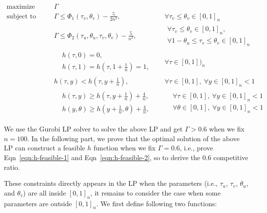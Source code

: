 \begin{align}
    \text{maximize}\qquad & \Gamma \nonumber \\
    \text{subject to}
    \qquad & \Gamma \leq \Phi_1(\tau_v,\theta_v) - \frac{5}{2n^2}, 
    &\forall \tau_v \leq \theta_v \in [0,1]_n & \label{constraint:v-arrive-first}& \\
    & \Gamma \leq \Phi_2(\tau_u,\theta_u,\tau_v,\theta_v) - \frac{5}{n^2}, 
    &\begin{aligned}
        \forall \tau_v \leq \theta_v \in [0,1]_n, \\
        \forall 1-\theta_u\le \tau_v \le \theta_v \in [0,1]_n 
    \end{aligned} &
    \label{constraint:u-arrive-first} &\\
& 
\begin{aligned}
    &h(\tau,0) = 0, \\
    &h(\tau,1) = h(\tau, 1+\frac{1}{n}) = 1,
\end{aligned}\quad 
  &\forall \tau \in [0,1])_n &&\\ 
& h(\tau,y) < h(\tau, y+\frac{1}{n}),
  & \forall \tau \in [0,1], ~\forall y\in[0,1]_n < 1 &\tag{Monotonicity} &\\
&\begin{aligned}
 & \textstyle h(\tau, y) \geq h(\tau, y+\frac{1}{n}) + \frac{4}{n}, \\
 & \textstyle h(y, \theta) \geq h(y+\frac{1}{n}, \theta) + \frac{4}{n},  
\end{aligned} 
& \begin{aligned}
    &\forall \tau \in [0,1], ~\forall y\in[0,1]_n < 1 \\
    &\forall \theta \in [0,1], ~\forall y\in[0,1]_n < 1 
\end{aligned}
&\tag{Lipschitzness} &
\end{align}


We use the Gurobi LP solver to solve the above LP and get $\Gamma >0.6$ when we fix $n=100$. In the following part, we prove that the optimal solution of the above LP can construct a feasible $h$ function when we fix $\Gamma = 0.6$, i.e., prove Eqn~\eqref{eqn:h-feasible-1} and Eqn~\eqref{eqn:h-feasible-2}, so to derive the $0.6$ competitive ratio. 

These constraints directly appears in the LP when the parameters (i.e., $\tau_u$, $\tau_v$, $\theta_u$, and $\theta_v$) are all inside $[0,1]_n$, it remains to consider the case when some parameters are outside $[0,1]_n$. We first define following two functions: 

